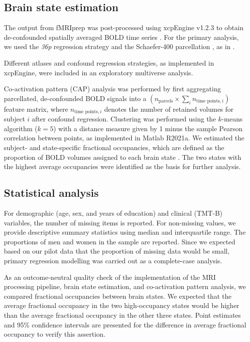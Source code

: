 \subsection{Brain state estimation}
The output from fMRIprep was post-processed using xcpEngine v1.2.3 to obtain de-confounded spatially averaged BOLD time series \citep{Ciric2017-cl}.
For the primary analysis, we used the \textit{36p} regression strategy and the Schaefer-\num{400} parcellation \citep{Schaefer2018-bo}, as in \citep{Schlemm2022-he}.
 
Different atlases and confound regression strategies, as implemented in xcpEngine, were included in an exploratory multiverse analysis.

Co-activation pattern (CAP) analysis was performed by first aggregating parcellated, de-confounded BOLD signals into a $\left(n_{\text{parcels}}\times \sum_i{n_{\text{time points}, i}}\right)$ feature matrix, where $n_{\text{time points}, i}$ denotes the number of retained volumes for subject $i$ after confound regression.
Clustering was performed using the $k$-means algorithm ($k=5$) with a distance measure given by 1 minus the sample Pearson correlation between points, as implemented in Matlab R2021a.
We estimated the subject- and state-specific fractional occupancies, which are defined as the proportion of BOLD volumes assigned to each brain state \citep{Vidaurre2018-pb}. 
The two states with the highest average occupancies were identified as the basis for further analysis.

\subsection{Statistical analysis}
For demographic (age, sex, and years of education) and clinical (TMT-B) variables, the number of missing items is reported.
For non-missing values, we provide descriptive summary statistics using median and interquartile range.
The proportions of men and women in the sample are reported. Since we expected based on our pilot data \citep{Schlemm2022-he} that the proportion of missing data would be small, primary regression modelling was carried out as a complete-case analysis.

As an outcome-neutral quality check of the implementation of the MRI processing pipeline, brain state estimation, and co-activation pattern analysis, we compared fractional occupancies between brain states.
We expected that the average fractional occupancy in the two high-occupancy states would be higher than the average fractional occupancy in the other three states.
Point estimates and 95\% confidence intervals are presented for the difference in average fractional occupancy to verify this assertion.


